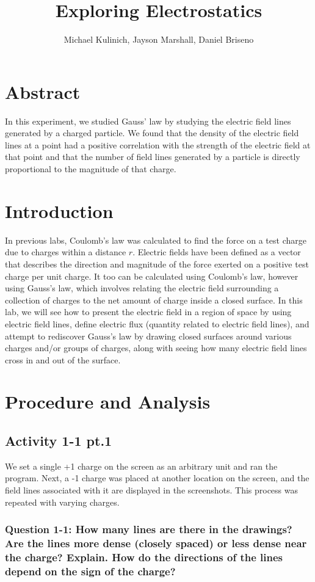 \documentclass[oneside,12pt]{amsart}
\title{Exploring Electrostatics}
\author{Michael Kulinich, Jayson Marshall, Daniel Briseno}
\date{}
\begin{document}
	\maketitle
	\section{Abstract}
	In this experiment, we studied Gauss’ law by studying the electric field lines generated by a charged particle. We found that the density of the electric field lines at a point had a positive correlation with the strength of the electric field at that point and that the number of field lines generated by a particle is directly proportional to the magnitude of that charge.
	
	
	\section{Introduction}
	In previous labs, Coulomb’s law was calculated to find the force on a test charge due to charges within a distance $r$. Electric fields have been defined as a vector that describes the direction and magnitude of the force exerted on a positive test charge per unit charge.  It too can be calculated using Coulomb’s law, however using Gauss’s law, which involves relating the electric field surrounding a collection of charges to the net amount of charge inside a closed surface. In this lab, we will see how to present the electric field in a region of space by using electric field lines, define electric flux (quantity related to electric field lines), and attempt to rediscover Gauss’s law by drawing closed surfaces around various charges and/or groups of charges, along with seeing how many electric field lines cross in and out of the surface.
	\newpage
	\section{Procedure and Analysis}
	
	\subsection{Activity 1-1 pt.1}We set a single +1 charge on the screen as an arbitrary unit and ran the program. Next, a -1 charge was placed at another location on the screen, and the field lines associated with it are displayed in the screenshots. This process was repeated with varying charges.
		\subsubsection{Question 1-1: How many lines are there in the drawings? Are the lines more dense (closely spaced) or less dense near the charge? Explain. How do the directions of the lines depend on the sign of the charge? }
     	
\end{document}

